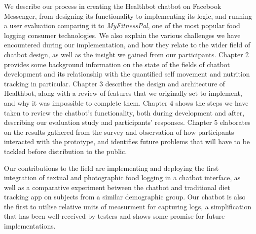 We describe our process in creating the Healthbot chatbot on Facebook Messenger, from designing its functionality to implementing its logic, and running a user evaluation comparing it to \textit{MyFitnessPal}, one of the most popular food logging consumer technologies. We also explain the various challenges we have encountered during our implementation, and how they relate to the wider field of chatbot design, as well as the insight we gained from our participants. Chapter 2 provides some background information on the state of the fields of chatbot development and its relationship with the quantified self movement and nutrition tracking in particular. Chapter 3 describes the design and architecture of Healthbot, along with a review of features that we originally set to implement, and why it was impossible to complete them. Chapter 4 shows the steps we have taken to review the chatbot's functionality, both during development and after, describing our evaluation study and participants' responses. Chapter 5 elaborates on the results gathered from the survey and observation of how participants interacted with the prototype, and identifies future problems that will have to be tackled before distribution to the public.

Our contributions to the field are implementing and deploying the first integration of textual and photographic food logging in a chatbot interface, as well as a comparative experiment between the chatbot and traditional diet tracking app on subjects from a similar demographic group. Our chatbot is also the first to utilise relative units of measurment for capturing logs, a simplification that has been well-received by testers and shows some promise for future implementations.
